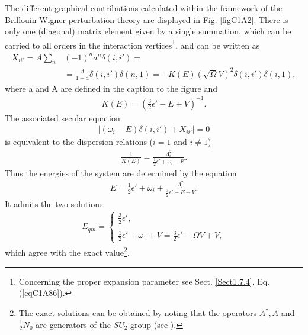The different graphical contributions calculated within the framework of the
Brillouin-Wigner perturbation theory are displayed in Fig. \ref{figC1A2}. There is only
one (diagonal) matrix element given by a single summation, which can be
carried to all orders in the interaction vertices\footnote{Concerning the proper expansion parameter see Sect. \ref{Sect1.7.4}, Eq. (\ref{eqC1A86}).}, and can be written as
 \begin{align}\label{eqC1A31} 
\nonumber X_{ii'}=A\sum_n&(-1)^na^n\delta(i,i')=\\
&=\frac{A}{1+a}\delta(i,i')\delta(n,1)=-K(E)(\sqrt{\Omega}V)^2\delta(i,i')\delta(i,1),
 \end{align}
where a and A are defined in the caption to the figure and
 \begin{align}\label{eqC1A32} 
K(E)=\left(\tfrac{3}{2}\epsilon'-E+V\right)^{-1}.
 \end{align}
The associated secular equation
 \begin{align}\label{eqC1A33} 
\left|(\omega_i-E)\delta(i,i')+X_{ii'}\right|=0
 \end{align}
is equivalent to the dispersion relations ($i=1$ and $i\neq1$)
 \begin{align}\label{eqC1A34} 
\frac{1}{K(E)}=\frac{\Lambda_i^2}{\frac{1}{2}\epsilon'+\omega_i-E}.
 \end{align}
Thus the energies of the system are determined by the equation
 \begin{align}\label{eqC1A35} 
E=\frac{1}{2}\epsilon'+\omega_i+\frac{\Lambda_i^2}{\tfrac{3}{2}\epsilon'-E+V}.
 \end{align}
It admits the two solutions
 \begin{align}\label{eqC1A36} 
E_{qm}=\left\{\begin{array}{l}
\frac{3}{2}\epsilon', \\ 
\\
\frac{1}{2}\epsilon'+\omega_1+V=\frac{3}{2}\epsilon'-\Omega V+V,
\end{array} 
\right.
 \end{align}
which agree with the exact value\footnote{The exact solutions can be  obtained  by noting that the operators $A^\dagger,A$ and $\frac{1}{2}N_0$ are generators of the $SU_2$ group (see \cite{Bortignon:77}).}.


